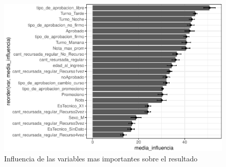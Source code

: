 \begin{figure}[!htb]
	\centering
	\includegraphics{imagenes/variables/influencia_de_variables_23-1.pdf}
	\caption{Influencia de las variables mas importantes sobre el resultado}
	\label{fig:rfe_influencia_var_dsalternativa2}
\end{figure}



